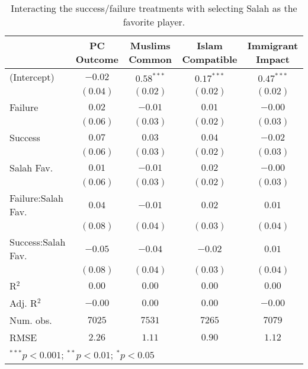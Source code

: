 
\begin{table}[H]
\begin{center}
\begin{footnotesize}
\begin{tabular}{l c c c c}
\hline
 & PC Outcome & Muslims Common & Islam Compatible & Immigrant Impact \\
\hline
(Intercept)        & $-0.02$  & $0.58^{***}$ & $0.17^{***}$ & $0.47^{***}$ \\
                   & $(0.04)$ & $(0.02)$     & $(0.02)$     & $(0.02)$     \\
Failure            & $0.02$   & $-0.01$      & $0.01$       & $-0.00$      \\
                   & $(0.06)$ & $(0.03)$     & $(0.02)$     & $(0.03)$     \\
Success            & $0.07$   & $0.03$       & $0.04$       & $-0.02$      \\
                   & $(0.06)$ & $(0.03)$     & $(0.02)$     & $(0.03)$     \\
Salah Fav.         & $0.01$   & $-0.01$      & $0.02$       & $-0.00$      \\
                   & $(0.06)$ & $(0.03)$     & $(0.02)$     & $(0.03)$     \\
Failure:Salah Fav. & $0.04$   & $-0.01$      & $0.02$       & $0.01$       \\
                   & $(0.08)$ & $(0.04)$     & $(0.03)$     & $(0.04)$     \\
Success:Salah Fav. & $-0.05$  & $-0.04$      & $-0.02$      & $0.01$       \\
                   & $(0.08)$ & $(0.04)$     & $(0.03)$     & $(0.04)$     \\
\hline
R$^2$              & $0.00$   & $0.00$       & $0.00$       & $0.00$       \\
Adj. R$^2$         & $-0.00$  & $0.00$       & $0.00$       & $-0.00$      \\
Num. obs.          & $7025$   & $7531$       & $7265$       & $7079$       \\
RMSE               & $2.26$   & $1.11$       & $0.90$       & $1.12$       \\
\hline
\multicolumn{5}{l}{\tiny{$^{***}p<0.001$; $^{**}p<0.01$; $^{*}p<0.05$}}
\end{tabular}
\end{footnotesize}
\caption{Interacting the success/failure treatments with selecting Salah as the favorite player.}
\label{tab:success_fav}
\end{center}
\end{table}
